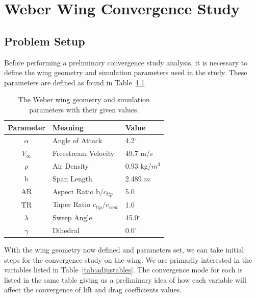 \documentclass{report}
\begin{document}
\tableofcontents


\chapter{Weber Wing Convergence Study}
\section{Problem Setup}

Before performing a preliminary convergence study analysis, it is necessary to define the wing geometry and simulation parameters used in the study.
These parameters are defined as found in Table~\ref{tab:geometry_weber}

\begin{table}[H]
    \centering
    \caption{The Weber wing geometry and simulation parameters with their given values.}\label{tab:geometry_weber}
    \begin{tabular}{c l l}
        \toprule
        \textbf{Parameter} & \textbf{Meaning} & \textbf{Value} \\
        \midrule
        $\alpha$ & Angle of Attack & 4.2$^\circ$ \\
        $V_{\infty}$ & Freestream Velocity & 49.7 m/s \\
        $\rho$ & Air Density & 0.93 kg/$m^3$ \\
        b & Span Length & 2.489 $m$ \\
        AR & Aspect Ratio b/${c_{tip}}$ & 5.0 \\
        TR & Taper Ratio ${c_{tip}}/{c_{root}}$ & 1.0 \\
        $\lambda$ & Sweep Angle & 45.0$^\circ$ \\
        $\gamma$ & Dihedral & 0.0$^\circ$ \\

    \end{tabular}
\end{table}

With the wing geometry now defined and parameters set, we can take initial steps for the convergence study on the wing. We are primarily interested in the variables listed in Table~\ref{tab:adjustables}.
The convergence mode for each is listed in the same table giving us a preliminary idea of how each variable will affect the convergence of lift and drag coefficients values.
\end{document}
